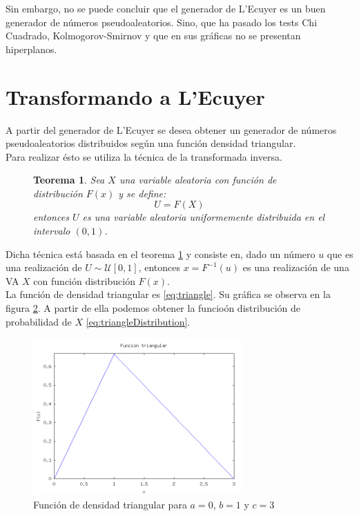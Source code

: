 \documentclass{sig-alternate}
\newtheorem{theorem}{Teorema}
\begin{document}
Sin embargo, no se puede concluir que el generador de L'Ecuyer es un buen generador de n\'umeros
pseudoaleatorios. Sino, que ha pasado los tests Chi Cuadrado, Kolmogorov-Smirnov y que en sus
gr\'aficas no se presentan hiperplanos.

\section{Transformando a L'Ecuyer}
\label{sec:triangle}

A partir del generador de L'Ecuyer se desea obtener un generador de n\'umeros
pseudoaleatorios distribuidos seg\'un una funci\'on densidad triangular.\\
Para realizar \'esto se utiliza la t\'ecnica de la transformada inversa.

\begin{figure}[ht]
\begin{theorem}
\label{theo:1}
Sea $X$ una variable aleatoria con funci\'on de distribuci\'on $F(x)$
y se define:
$$U=F(X)$$
entonces $U$ es una variable aleatoria uniformemente distribuida en el intervalo $(0,1)$.
\end{theorem}
\end{figure}

Dicha t\'ecnica est\'a basada en el teorema \ref{theo:1} y consiste
en, dado un n\'umero $u$ que es una realizaci\'on de $U\sim\mathcal{U}[0,1]$,
entonces $x = F^{-1}(u)$ es una realizaci\'on de una VA $X$ con funci\'on
distribuci\'on $F(x)$.\\

La funci\'on de densidad triangular es \eqref{eq:triangle}. Su gr\'afica se observa
en la figura \ref{fig:triangle_fun}. A partir de ella podemos obtener
la funcio\'on distribuci\'on de probabilidad de $X$
\eqref{eq:triangleDistribution}.


\begin{figure}[ht]
\label{fig:triangle_fun}
\includegraphics[width=8cm]{triangular}
\caption{Funci\'on de densidad triangular para $a=0$, $b=1$ y $c=3$}
\end{figure}
\end{document}
